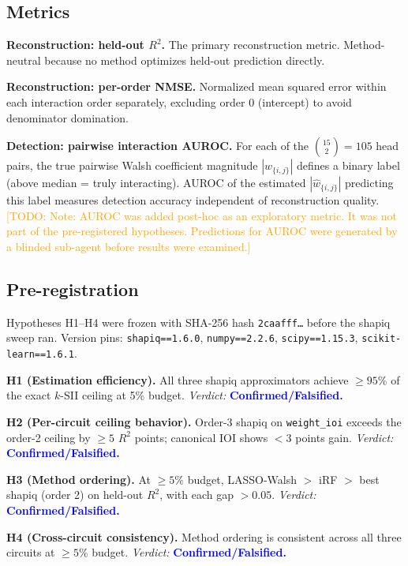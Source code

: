 \documentclass[11pt]{article}
\newcommand{\todo}[1]{\textcolor{orange}{[TODO: #1]}}
\newcommand{\numplaceholder}[1]{\textcolor{blue}{\textbf{#1}}}
\begin{document}
\subsection{Metrics}

\textbf{Reconstruction: held-out $R^2$.}
The primary reconstruction metric. Method-neutral because no method
optimizes held-out prediction directly.

\textbf{Reconstruction: per-order NMSE.}
Normalized mean squared error within each interaction order separately,
excluding order 0 (intercept) to avoid denominator domination.

\textbf{Detection: pairwise interaction AUROC.}
For each of the $\binom{15}{2} = 105$ head pairs, the true pairwise
Walsh coefficient magnitude $|w_{\{i,j\}}|$ defines a binary label
(above median = truly interacting). AUROC of the estimated
$|\hat{w}_{\{i,j\}}|$ predicting this label measures detection accuracy
independent of reconstruction quality.
%
\todo{Note: AUROC was added post-hoc as an exploratory metric. It was
not part of the pre-registered hypotheses. Predictions for AUROC were
generated by a blinded sub-agent before results were examined.}

\subsection{Pre-registration}

Hypotheses H1--H4 were frozen with SHA-256 hash
\texttt{2caafff\ldots} before the shapiq sweep ran. Version pins:
\texttt{shapiq==1.6.0}, \texttt{numpy==2.2.6},
\texttt{scipy==1.15.3}, \texttt{scikit-learn==1.6.1}.

\textbf{H1 (Estimation efficiency).}
All three shapiq approximators achieve $\geq 95\%$ of the exact $k$-SII
ceiling at 5\% budget.
\emph{Verdict:} \numplaceholder{Confirmed/Falsified.}

\textbf{H2 (Per-circuit ceiling behavior).}
Order-3 shapiq on \texttt{weight\_ioi} exceeds the order-2 ceiling
by $\geq 5$ $R^2$ points; canonical IOI shows $< 3$ points gain.
\emph{Verdict:} \numplaceholder{Confirmed/Falsified.}

\textbf{H3 (Method ordering).}
At $\geq 5\%$ budget, LASSO-Walsh $>$ iRF $>$ best shapiq (order 2)
on held-out $R^2$, with each gap $> 0.05$.
\emph{Verdict:} \numplaceholder{Confirmed/Falsified.}

\textbf{H4 (Cross-circuit consistency).}
Method ordering is consistent across all three circuits at $\geq 5\%$
budget.
\emph{Verdict:} \numplaceholder{Confirmed/Falsified.}
\end{document}

